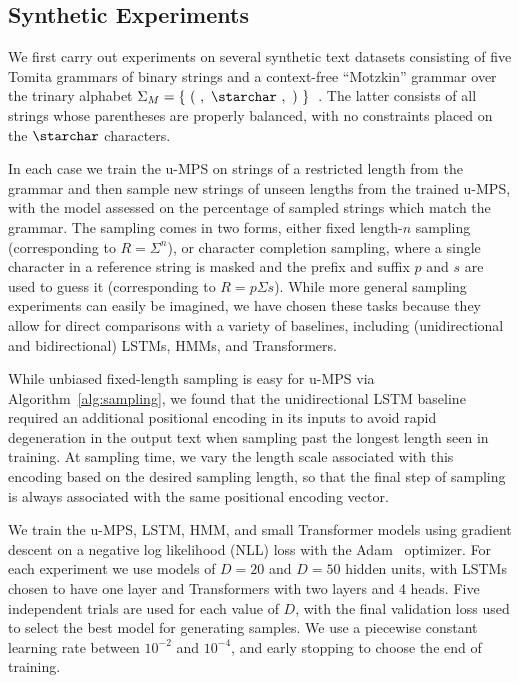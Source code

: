 \subsection{Synthetic Experiments}

We first carry out experiments on several synthetic text datasets consisting of five Tomita grammars of binary strings and a context-free ``Motzkin'' grammar over the trinary alphabet $\Sigma_{M} = \{\mathtt{\ (\ ,\ \starchar\ ,\ )\ }\}$~\citep{tomita1982, alexander2018}. The latter consists of all strings whose parentheses are properly balanced, with no constraints placed on the $\mathtt{\starchar}$ characters. 

In each case we train the u-MPS on strings of a restricted length from the grammar and then sample new strings of unseen lengths from the trained u-MPS, with the model assessed on the percentage of sampled strings which match the grammar. The sampling comes in two forms, either fixed length-$n$ sampling (corresponding to $R = \Sigma^n$), or character completion sampling, where a single character in a reference string is masked and the prefix and suffix $p$ and $s$ are used to guess it (corresponding to $R = p \Sigma s$). While more general sampling experiments can easily be imagined, we have chosen these tasks because they allow for direct comparisons with a variety of baselines, including (unidirectional and bidirectional) LSTMs, HMMs, and Transformers.

While unbiased fixed-length sampling is easy for u-MPS via Algorithm~\ref{alg:sampling}, we found that the unidirectional LSTM baseline required an additional positional encoding in its inputs to avoid rapid degeneration in the output text when sampling past the longest length seen in training. At sampling time, we vary the length scale associated with this encoding based on the desired sampling length, so that the final step of sampling is always associated with the same positional encoding vector.

We train the u-MPS, LSTM, HMM, and small Transformer models using gradient descent on a negative log likelihood (NLL) loss with the Adam~\citep{kingma2015} optimizer. For each experiment we use models of $D=20$ and $D=50$ hidden units, with LSTMs chosen to have one layer and Transformers with two layers and 4 heads. Five independent trials are used for each value of $D$, with the final validation loss used to select the best model for generating samples. We use a piecewise constant learning rate between $10^{-2}$ and $10^{-4}$, and early stopping to choose the end of training.

